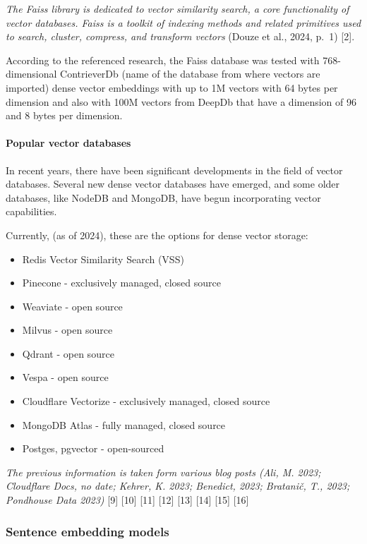 \documentclass[11pt]{wseas}
\begin{document}
\emph{The Faiss library is dedicated to vector similarity search, a core
functionality of vector databases. Faiss is a toolkit of indexing
methods and related primitives used to search, cluster, compress, and
transform vectors} (Douze et al., 2024, p.~1) {[}2{]}.

According to the referenced research, the Faiss database was tested with
768-dimensional ContrieverDb (name of the database from where vectors
are imported) dense vector embeddings with up to 1M vectors with 64
bytes per dimension and also with 100M vectors from DeepDb that have a
dimension of 96 and 8 bytes per dimension.

\paragraph{Popular vector databases}\label{popular-vector-databases}

In recent years, there have been significant developments in the field
of vector databases. Several new dense vector databases have emerged,
and some older databases, like NodeDB and MongoDB, have begun
incorporating vector capabilities.

Currently, (as of 2024), these are the options for dense vector storage:

\begin{itemize}
\tightlist
\item
  Redis Vector Similarity Search (VSS)
\item
  Pinecone - exclusively managed, closed source
\item
  Weaviate - open source
\item
  Milvus - open source
\item
  Qdrant - open source
\item
  Vespa - open source
\item
  Cloudflare Vectorize - exclusively managed, closed source
\item
  MongoDB Atlas - fully managed, closed source
\item
  Postges, pgvector - open-sourced
\end{itemize}

\emph{The previous information is taken form various blog posts (Ali, M.
2023; Cloudflare Docs, no date; Kehrer, K. 2023; Benedict, 2023;
Bratanič, T., 2023; Pondhouse Data 2023)} {[}9{]} {[}10{]} {[}11{]}
{[}12{]} {[}13{]} {[}14{]} {[}15{]} {[}16{]}

    \subsubsection{Sentence embedding
models}\label{sentence-embedding-models}
\end{document}
